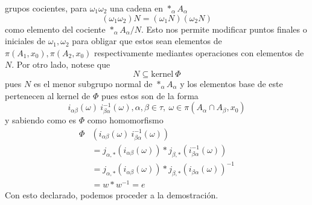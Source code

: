 grupos cocientes, para \(\omega_1 \omega_2 \) una cadena en \(*_\alpha
A_\alpha\)
\[ (\omega_1 \omega_2) N = (\omega_1 N) (\omega_2 N) \]
como elemento del cociente \(*_\alpha A_\alpha / N\). Esto nos permite
modificar puntos finales o iniciales de \(\omega_1, \omega_2\) para
obligar que estos sean elementos de \(\pi (A_1, x_0), \pi (A_2, x_0)\)
respectivamente mediantes operaciones con elementos de \(N\). Por otro
lado, notese que
\[ N \subseteq \text{kernel} \ \Phi \]
pues \(N\) es el menor subgrupo normal de \(*_\alpha A_\alpha\) y los
elementos base de este pertenecen al kernel de \(\Phi\) pues estos son
de la forma
\[ i_{\alpha \beta} (\omega) \ i_{\beta \alpha}^{-1} (\omega) ,
  \alpha,\beta \in \tau,\ \omega \in \pi(A_\alpha \cap A_\beta , x_0)\]
y sabiendo como es \(\Phi\) como homomorfismo
\begin{align*}
  \Phi &\left( i_{\alpha \beta} (\omega) \ i_{\beta \alpha}^{-1} (\omega) \right) \\
       &= j_{\alpha,*} \left(  i_{\alpha \beta} (\omega) \right) * j_{\beta,*} \left( i_{\beta \alpha}^{-1} (\omega) \right) \\
       &= j_{\alpha,*} \left(  i_{\alpha \beta} (\omega) \right) * j_{\beta,*} \left( i_{\beta \alpha} (\omega) \right)^{-1} \\
       &= w * w^{-1} = e
\end{align*}
Con esto
declarado, podemos proceder a la demostración.
